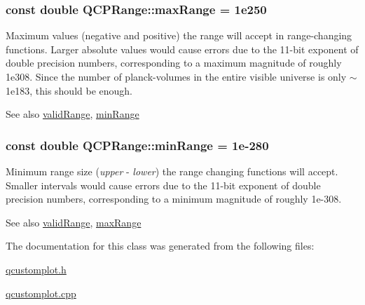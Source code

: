 \subsubsection[{\texorpdfstring{max\+Range}{maxRange}}]{\setlength{\rightskip}{0pt plus 5cm}const double Q\+C\+P\+Range\+::max\+Range = 1e250\hspace{0.3cm}{\ttfamily [static]}}\hypertarget{classQCPRange_a5ca51e7a2dc5dc0d49527ab171fe1f4f}{}\label{classQCPRange_a5ca51e7a2dc5dc0d49527ab171fe1f4f}
Maximum values (negative and positive) the range will accept in range-\/changing functions. Larger absolute values would cause errors due to the 11-\/bit exponent of double precision numbers, corresponding to a maximum magnitude of roughly 1e308. Since the number of planck-\/volumes in the entire visible universe is only $\sim$1e183, this should be enough. \begin{DoxySeeAlso}{See also}
\hyperlink{classQCPRange_ab38bd4841c77c7bb86c9eea0f142dcc0}{valid\+Range}, \hyperlink{classQCPRange_ab46d3bc95030ee25efda41b89e2b616b}{min\+Range} 
\end{DoxySeeAlso}
\subsubsection[{\texorpdfstring{min\+Range}{minRange}}]{\setlength{\rightskip}{0pt plus 5cm}const double Q\+C\+P\+Range\+::min\+Range = 1e-\/280\hspace{0.3cm}{\ttfamily [static]}}\hypertarget{classQCPRange_ab46d3bc95030ee25efda41b89e2b616b}{}\label{classQCPRange_ab46d3bc95030ee25efda41b89e2b616b}
Minimum range size ({\itshape upper} -\/ {\itshape lower}) the range changing functions will accept. Smaller intervals would cause errors due to the 11-\/bit exponent of double precision numbers, corresponding to a minimum magnitude of roughly 1e-\/308. \begin{DoxySeeAlso}{See also}
\hyperlink{classQCPRange_ab38bd4841c77c7bb86c9eea0f142dcc0}{valid\+Range}, \hyperlink{classQCPRange_a5ca51e7a2dc5dc0d49527ab171fe1f4f}{max\+Range} 
\end{DoxySeeAlso}


The documentation for this class was generated from the following files\+:\begin{DoxyCompactItemize}
\item 
\hyperlink{qcustomplot_8h}{qcustomplot.\+h}\item 
\hyperlink{qcustomplot_8cpp}{qcustomplot.\+cpp}\end{DoxyCompactItemize}
